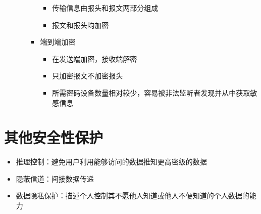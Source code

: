 \begin{itemize}
\begin{itemize}
\begin{itemize}
\begin{itemize}
                \item 传输信息由报头和报文两部分组成
                \item 报文和报头均加密
            \end{itemize}
            \item 端到端加密
            \begin{itemize}
                \item 在发送端加密，接收端解密
                \item 只加密报文不加密报头
                \item 所需密码设备数量相对较少，容易被非法监听者发现并从中获取敏感信息
            \end{itemize}
        \end{itemize}
    \end{itemize}
\end{itemize}

\section{其他安全性保护}
\begin{itemize}
    \item 推理控制：避免用户利用能够访问的数据推知更高密级的数据
    \item 隐蔽信道：间接数据传递
    \item 数据隐私保护：描述个人控制其不愿他人知道或他人不便知道的个人数据的能力
\end{itemize}